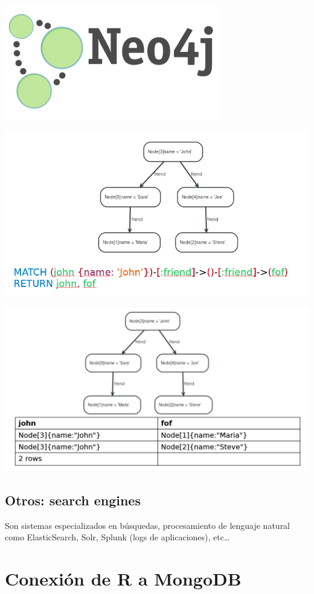 \documentclass[
]{book}
\begin{document}
\includegraphics{images/Neo4jlogo.png}

\includegraphics{images/CypherQuery.png}

\includegraphics{images/CypherResult.png}

\subsection{Otros: search engines}\label{otros-search-engines}

Son sistemas especializados en búsquedas, procesamiento de lenguaje natural como ElasticSearch, Solr, Splunk (logs de aplicaciones), etc\ldots{}

\section{Conexión de R a MongoDB}\label{conexiuxf3n-de-r-a-mongodb}
\end{document}
